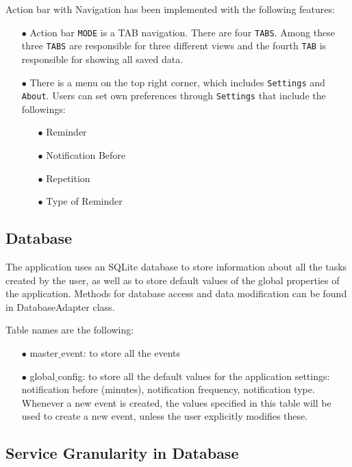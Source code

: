 \documentclass[10pt,a4paper]{report}
\begin{document}
Action bar with Navigation has been implemented with the following features:
\begin{itemize}

 \item[$\bullet$] Action bar \texttt{MODE} is a TAB navigation. There are four \texttt{TABS}. Among these three \texttt{TABS} are responsible for three different views and the fourth \texttt{TAB} is responsible for showing all saved data.
\item[$\bullet$] There is a menu on the top right corner, which includes \texttt{Settings} and \texttt{About}. Users can set own preferences through \texttt{Settings} that include the followings:

	\begin{itemize}
	   \item[$\bullet$] Reminder
	   \item[$\bullet$] Notification Before
	   \item[$\bullet$] Repetition
	   \item[$\bullet$] Type of Reminder
	\end{itemize}

\end{itemize}

\subsection{Database}

The application uses an SQLite database to store information about all the tasks created by the user, as well as to store default values of the global properties of the application. Methods for database access and data modification can be found in DatabaseAdapter class.

Table names are the following:

	\begin{itemize}
	  \item[$\bullet$]  master$\_$event: to store all the events
	  \item[$\bullet$]  global$\_$config: to store all the default values for the application settings: notification before (minutes), notification frequency, notification type. Whenever a new event is created, the values specified in this table will be used to create a new event, unless the user explicitly modifies these.
	\end{itemize}
	
 \subsection{Service Granularity in Database}
\end{document}
